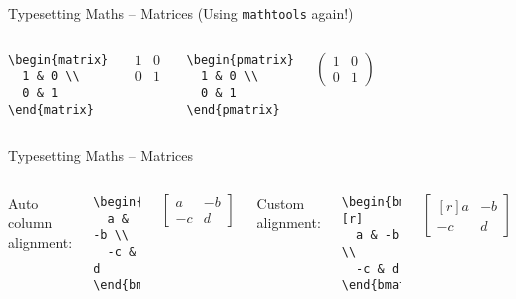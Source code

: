 \documentclass[t]{beamer}
\begin{document}
\begin{frame}[fragile]{Typesetting Maths -- Matrices}
  (Using \texttt{mathtools} again!)
  \begin{columns}[t]
    \begin{verbatim}
\begin{matrix}
  1 & 0 \\
  0 & 1
\end{matrix}
    \end{verbatim}

    $$
      \begin{matrix}
        1 & 0 \\
        0 & 1
      \end{matrix}
    $$

    \begin{verbatim}
\begin{pmatrix}
  1 & 0 \\
  0 & 1
\end{pmatrix}
    \end{verbatim}

    $$
      \begin{pmatrix}
        1 & 0 \\
        0 & 1
      \end{pmatrix}
    $$
  \end{columns}
\end{frame}

\begin{frame}[fragile]{Typesetting Maths -- Matrices}
  \begin{columns}[t]
    Auto column alignment:

    \begin{verbatim}
\begin{bmatrix}
  a & -b \\
  -c & d
\end{bmatrix}
    \end{verbatim}

    $$
      \begin{bmatrix}
        a & -b \\
        -c & d
      \end{bmatrix}
    $$

    Custom alignment:

    \begin{verbatim}
\begin{bmatrix*}[r]
  a & -b \\
  -c & d
\end{bmatrix*}
    \end{verbatim}

    $$
      \begin{bmatrix*}[r]
        a & -b \\
        -c & d
      \end{bmatrix*}
    $$
  \end{columns}
\end{frame}
\end{document}
